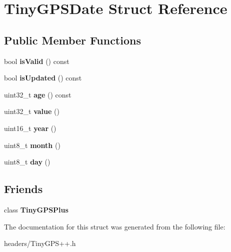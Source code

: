 \section{Tiny\+G\+P\+S\+Date Struct Reference}
\label{struct_tiny_g_p_s_date}
\subsection*{Public Member Functions}
\begin{DoxyCompactItemize}
\item 
bool {\bfseries is\+Valid} () const \label{struct_tiny_g_p_s_date_a0ef145848ab03e4e9db0e2cf3a4c42cd}

\item 
bool {\bfseries is\+Updated} () const \label{struct_tiny_g_p_s_date_aed8706c1c3e67558fec2b94476c144e0}

\item 
uint32\+\_\+t {\bfseries age} () const \label{struct_tiny_g_p_s_date_a7b92ac9058dbde1770eb52ce5da890c1}

\item 
uint32\+\_\+t {\bfseries value} ()\label{struct_tiny_g_p_s_date_a718150ae16f68afa9ae81f9d1b3ce3f4}

\item 
uint16\+\_\+t {\bfseries year} ()\label{struct_tiny_g_p_s_date_ae2cc914fec377b429d99f01204f50d60}

\item 
uint8\+\_\+t {\bfseries month} ()\label{struct_tiny_g_p_s_date_a6f3c5b4e72ef28b010f94ac9016315f3}

\item 
uint8\+\_\+t {\bfseries day} ()\label{struct_tiny_g_p_s_date_ae8cc5f80c49e328f792d168a44062000}

\end{DoxyCompactItemize}
\subsection*{Friends}
\begin{DoxyCompactItemize}
\item 
class {\bfseries Tiny\+G\+P\+S\+Plus}\label{struct_tiny_g_p_s_date_a6501fd5ef19ae166d43e0e5781609ee2}

\end{DoxyCompactItemize}


The documentation for this struct was generated from the following file\+:\begin{DoxyCompactItemize}
\item 
headers/Tiny\+G\+P\+S++.\+h\end{DoxyCompactItemize}
